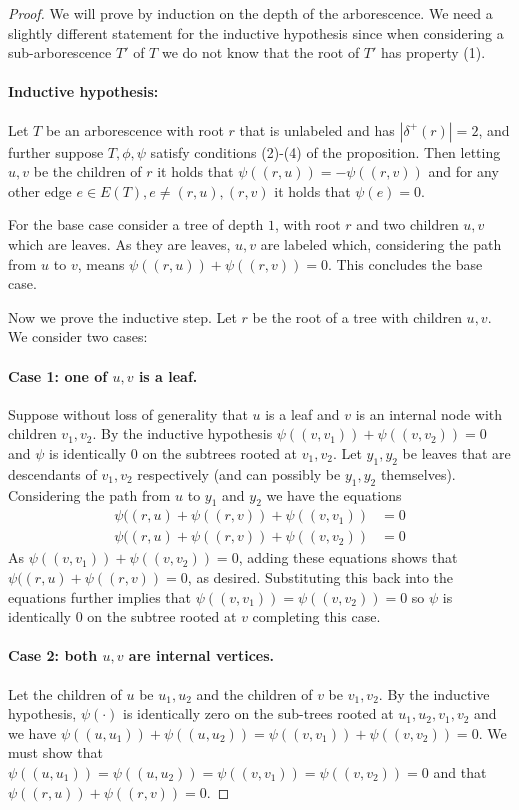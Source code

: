 \begin{proof}
We will prove by induction on the depth of the arborescence.  We need a slightly different statement for the inductive hypothesis
since when considering a sub-arborescence $T'$ of $T$ we do not know that the root of $T'$ has property (1).

\paragraph{Inductive hypothesis:} Let $T$ be an arborescence with root $r$ that is unlabeled and has $|\delta^+(r)| = 2$, and further suppose
$T, \phi, \psi$ satisfy conditions (2)-(4) of the proposition.  Then letting $u,v$ be the children of $r$ it holds that
$\psi((r,u)) = -\psi((r,v))$ and for any other edge $e \in E(T), e \ne (r,u),(r,v)$ it holds that $\psi(e) = 0$.

For the base case consider a tree of depth $1$, with root $r$ and two children $u,v$ which are leaves.  As they are leaves, $u,v$ are
labeled which, considering the path from $u$ to $v$, means $\psi((r,u)) + \psi((r,v)) = 0$.  This concludes the base case.

Now we prove the inductive step.  Let $r$ be the root of a tree with children $u,v$.  We consider two cases:
\paragraph{Case 1: one of $u,v$ is a leaf.} Suppose without loss of generality that $u$ is a leaf and $v$ is an internal node with children $v_1, v_2$.
By the inductive hypothesis $\psi((v,v_1)) + \psi((v,v_2)) = 0$ and $\psi$ is identically $0$ on the subtrees rooted at $v_1,v_2$.  Let $y_1, y_2$ be leaves
that are descendants of $v_1,v_2$ respectively (and can possibly be $y_1,y_2$ themselves).  Considering the path from $u$ to $y_1$ and $y_2$ we have
the equations
\begin{align*}
\psi((r,u) + \psi((r,v)) + \psi((v,v_1)) &= 0 \\
\psi((r,u) + \psi((r,v)) + \psi((v,v_2)) &= 0
\end{align*}
As $\psi((v,v_1)) + \psi((v,v_2)) = 0$, adding these equations shows that $\psi((r,u) + \psi((r,v)) =0$, as desired.  Substituting this back
into the equations further implies that $\psi((v,v_1)) = \psi((v,v_2)) = 0$ so $\psi$ is identically $0$ on the subtree rooted at $v$ completing
this case.

\paragraph{Case 2: both $u,v$ are internal vertices.} Let the children of $u$ be $u_1, u_2$ and the
children of $v$ be $v_1, v_2$.
By the inductive hypothesis, $\psi(\cdot)$ is identically zero on the sub-trees rooted at $u_1, u_2, v_1, v_2$
and we have $\psi((u,u_1)) + \psi((u,u_2)) = \psi((v,v_1)) + \psi((v,v_2))= 0$.  We must show that $\psi((u,u_1))= \psi((u,u_2))=\psi((v,v_1)) =\psi((v,v_2))= 0$
and that $\psi((r,u)) + \psi((r,v)) = 0$.


\end{proof}
